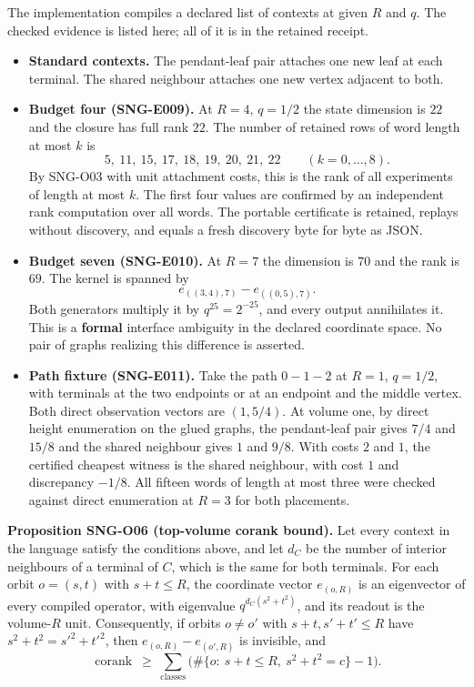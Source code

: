 \documentclass[
  11pt,
  a4paper,
]{report}
\providecommand{\tightlist}{%
  \setlength{\itemsep}{0pt}\setlength{\parskip}{0pt}}
\let\singularitytexttt\texttt
\renewcommand{\texttt}[1]{\singularitytexttt{\seqsplit{#1}}}
\begin{document}
The implementation \texttt{BoundaryExperimentSystem} compiles a declared
list of contexts at given \(R\) and \(q\). The checked evidence is
listed here; all of it is in the retained receipt.

\begin{itemize}
\tightlist
\item
  \textbf{Standard contexts.} The pendant-leaf pair attaches one new
  leaf at each terminal. The shared neighbour attaches one new vertex
  adjacent to both.
\item
  \textbf{Budget four (SNG-E009).} At \(R=4\), \(q=1/2\) the state
  dimension is \(22\) and the closure has full rank \(22\). The number
  of retained rows of word length at most \(k\) is \[
  5,\ 11,\ 15,\ 17,\ 18,\ 19,\ 20,\ 21,\ 22\qquad(k=0,\ldots,8).
  \] By SNG-O03 with unit attachment costs, this is the rank of all
  experiments of length at most \(k\). The first four values are
  confirmed by an independent rank computation over all words. The
  portable certificate is retained, replays without discovery, and
  equals a fresh discovery byte for byte as JSON.
\item
  \textbf{Budget seven (SNG-E010).} At \(R=7\) the dimension is \(70\)
  and the rank is \(69\). The kernel is spanned by \[
  e_{((3,4),7)}-e_{((0,5),7)} .
  \] Both generators multiply it by \(q^{25}=2^{-25}\), and every output
  annihilates it. This is a \textbf{formal} interface ambiguity in the
  declared coordinate space. No pair of graphs realizing this difference
  is asserted.
\item
  \textbf{Path fixture (SNG-E011).} Take the path \(0-1-2\) at \(R=1\),
  \(q=1/2\), with terminals at the two endpoints or at an endpoint and
  the middle vertex. Both direct observation vectors are \((1,5/4)\). At
  volume one, by direct height enumeration on the glued graphs, the
  pendant-leaf pair gives \(7/4\) and \(15/8\) and the shared neighbour
  gives \(1\) and \(9/8\). With costs \(2\) and \(1\), the certified
  cheapest witness is the shared neighbour, with cost \(1\) and
  discrepancy \(-1/8\). All fifteen words of length at most three were
  checked against direct enumeration at \(R=3\) for both placements.
\end{itemize}

\textbf{Proposition SNG-O06 (top-volume corank bound).} Let every
context in the language satisfy the conditions above, and let \(d_C\) be
the number of interior neighbours of a terminal of \(C\), which is the
same for both terminals. For each orbit \(o=(s,t)\) with \(s+t\le R\),
the coordinate vector \(e_{(o,R)}\) is an eigenvector of every compiled
operator, with eigenvalue \(q^{d_C(s^2+t^2)}\), and its readout is the
volume-\(R\) unit. Consequently, if orbits \(o\ne o'\) with
\(s+t,s'+t'\le R\) have \(s^2+t^2=s'^2+t'^2\), then
\(e_{(o,R)}-e_{(o',R)}\) is invisible, and \[
\operatorname{corank}\ \ge\ \sum_{\text{classes}}\bigl(\#\{o:\ s+t\le R,\ s^2+t^2=c\}-1\bigr).
\]
\end{document}
